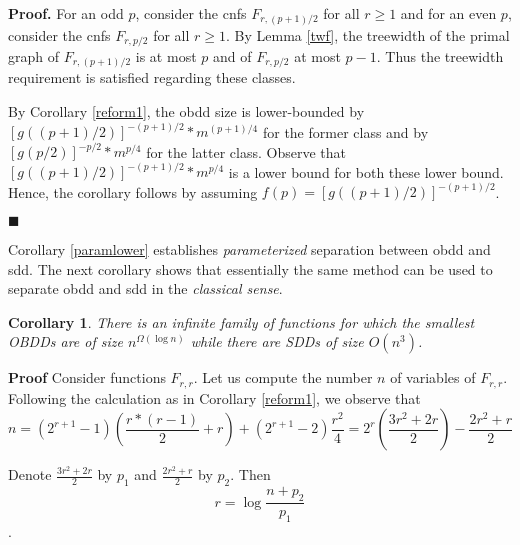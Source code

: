 \documentclass{article}
\newtheorem{corollary}{Corollary}
\begin{document}
{\bf Proof.}
For an odd $p$, consider the {\sc cnf}s $F_{r,(p+1)/2}$ for all $r \geq 1$
and for an even $p$, consider the {\sc cnf}s $F_{r,p/2}$ for all $r \geq 1$.
By Lemma \ref{twf}, the treewidth of the primal graph of $F_{r,(p+1)/2}$ is at 
most $p$ and of $F_{r,p/2}$ at most $p-1$. Thus the treewidth requirement is
satisfied regarding these classes. 

By Corollary \ref{reform1}, the {\sc obdd} size is lower-bounded by
$[g((p+1)/2)]^{-(p+1)/2}*m^{(p+1)/4}$ for the former class
and by $[g(p/2)]^{-p/2}*m^{p/4}$ for the latter class.
Observe that $[g((p+1)/2)]^{-(p+1)/2}*m^{p/4}$ is a lower bound for both
these lower bound. Hence, the corollary follows by assuming 
$f(p)=[g((p+1)/2)]^{-(p+1)/2}$.

\begin{comment}
Observe that for an even $p$ the primal graph treewidth of $F_{r,p}$ is $p-1$
and that the above argumentation still applies. Indeed, since $k=p/2$, it is 
legitimate to represent the lower bound as $2^{rp/4}$. Further on, in the inequality
that follows, the occurrence of $p+1$ in the denominator (as an upper bound of
the actual treewidth) even strengthens this inequality.
\end{comment}
$\blacksquare$ 

Corollary \ref{paramlower} establishes \emph{parameterized} separation between
{\sc obdd} and {\sc sdd}. The next corollary shows that essentially the same method
can be used to separate {\sc obdd} and {\sc sdd} in the \emph{classical sense}.

\begin{corollary}
There is an infinite family of functions for which the smallest OBDDs
are of size $n^{\Omega(\log n)}$ while there are SDDs of size $O(n^3)$.
\end{corollary}

{\bf Proof}
Consider functions $F_{r,r}$.
Let us compute the number $n$ of variables of $F_{r,r}$. 
Following the calculation as in Corollary \ref{reform1},
we observe that
\begin{equation}
n=(2^{r+1}-1)(\frac{r*(r-1)}{2}+r)+(2^{r+1}-2)\frac{r^2}{4}=
  2^{r}(\frac{3r^2+2r}{2})-\frac{2r^2+r}{2}
\end{equation}

Denote $\frac{3r^2+2r}{2}$ by $p_1$ and $\frac{2r^2+r}{2}$ by $p_2$.
Then 
\begin{equation} \label{maineq}
r=\log \frac{n+p_2}{p_1}
\end{equation}. 
\end{document}
